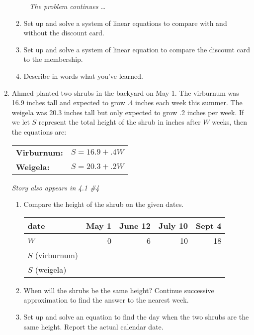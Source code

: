 \begin{enumerate}
\begin{enumerate}
\newpage %
~\hspace{-.5in} \emph{The problem continues \ldots}

\item Set up and solve a system of linear equations to compare with and without the discount card. \vfill \vfill
\item Set up and solve a system of linear equation to compare the discount card to the membership. \vfill \vfill
\item Describe in words what you've learned. \vfill
\end{enumerate}

\newpage %

\item Ahmed planted two shrubs in the backyard on May 1.  The virburnum was 16.9 inches tall and expected to grow .4 inches each week this summer.  The weigela was 20.3 inches tall but only expected to grow .2 inches per week.  If we let $S$ represent the total height of the shrub in inches after $W$ weeks, then the equations are:
\begin{center}
\begin{tabular} {ll} 
\textbf{Virburnum:} &$S=16.9+.4W$ \\
\textbf{Weigela:} & $S=20.3+.2W$ \\
\end{tabular}
\end{center}

 \hfill \emph{Story also appears in 4.1 \#4}
\begin{enumerate}
\item Compare the height of the shrub on the given dates.
\begin{center}
\begin{tabular} {|l|r|r|r|r|} \hline
date & May 1 & June 12 & July 10 & Sept 4 \\ \hline
$W$ & 0 & 6 & 10 & 18 \\ \hline
$S$ (virburnum) & &&&  \\ \hline
$S$ (weigela) & &&&\\ \hline
\end{tabular}
\end{center}
\item When will the shrubs be the same height?  Continue successive approximation to find the answer to the nearest week. \vfill
\item Set up and solve an equation to find the day when the two shrubs are the same height. Report the actual calendar date. \vfill
\end{enumerate}


\end{enumerate}
